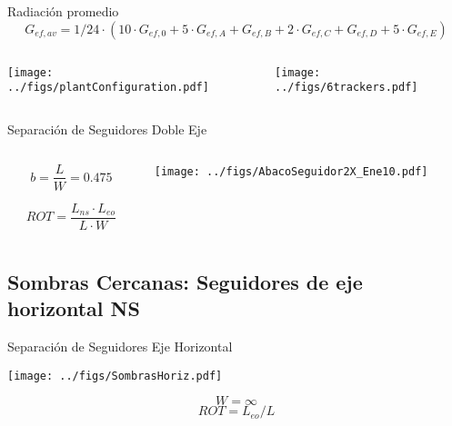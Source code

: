 \documentclass[aspectratio=169, usenames,svgnames,dvipsnames]{beamer}
\begin{document}
\begin{frame}[label={sec:orga6fe95e}]{Radiación promedio}
$$G_{ef, av} = 1/24 \cdot \left( 10 \cdot G_{ef,0} + 5 \cdot G_{ef,A} + G_{ef,B} + 2 \cdot G_{ef,C} + G_{ef,D} + 5 \cdot G_{ef,E} \right)$$

\begin{columns}
\begin{column}{0.4\columnwidth}
\begin{center}
\texttt{[image: ../figs/plantConfiguration.pdf]}
\end{center}
\end{column}

\begin{column}{0.6\columnwidth}
\begin{center}
\texttt{[image: ../figs/6trackers.pdf]}
\end{center}
\end{column}
\end{columns}
\end{frame}


\begin{frame}[label={sec:org7f56bd9}]{Separación de Seguidores Doble Eje}
\begin{columns}
\begin{column}{0.3\columnwidth}
$$b=\frac{L}{W}=0.475$$

$$ROT=\frac{L_{ns}\cdot L_{eo}}{L \cdot W}$$
\end{column}

\begin{column}{0.7\columnwidth}
\begin{center}
\texttt{[image: ../figs/AbacoSeguidor2X\_Ene10.pdf]}
\end{center}
\end{column}
\end{columns}
\end{frame}


\subsection{Sombras Cercanas: Seguidores de eje horizontal NS}
\label{sec:orgec69d47}

\begin{frame}[label={sec:orgecef636}]{Separación de Seguidores Eje Horizontal}
\begin{center}
\texttt{[image: ../figs/SombrasHoriz.pdf]}
\end{center}

$$W=\infty$$ $$ROT=L_{eo}/L$$
\end{frame}
\end{document}
